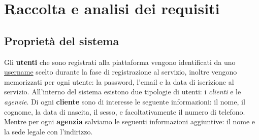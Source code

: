 \section{Raccolta e analisi dei requisiti}
\subsection{Proprietà del sistema}

%
%
Gli \textbf{utenti} che sono registrati alla piattaforma vengono identificati da uno \underline{username} scelto durante la fase di registrazione al servizio, inoltre vengono memorizzati per ogni utente: la password, l'email e la data di iscrizione al servizio.
%
%
All'interno del sistema esistono due tipologie di utenti: i \emph{clienti} e le \emph{agenzie}. Di ogni \textbf{cliente} sono di interesse le seguente informazioni: il nome, il cognome, la data di nascita, il sesso, e facoltativamente il numero di telefono. Mentre per ogni \textbf{agenzia} salviamo le seguenti informazioni aggiuntive: il nome e la sede legale con l'indirizzo.

